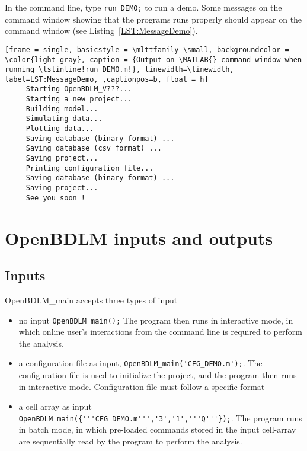 \documentclass{article}
\begin{document}
In the \MATLAB{} command line, type  
\colorbox{light-gray}{\lstinline[basicstyle = \mlttfamily \small, backgroundcolor = \color{light-gray}]!run_DEMO;! }
 to run a demo. 
Some messages on the \MATLAB{} command window showing that the programs runs properly  should appear on the \MATLAB{} command window (see Listing~\ref{LST:MessageDemo}).

\begin{lstlisting}[frame = single, basicstyle = \mlttfamily \small, backgroundcolor = \color{light-gray}, caption = {Output on \MATLAB{} command window when running \lstinline!run_DEMO.m!}, linewidth=\linewidth, label=LST:MessageDemo, ,captionpos=b, float = h] 
     Starting OpenBDLM_V???...
     Starting a new project...
     Building model...
     Simulating data...
     Plotting data...
     Saving database (binary format) ...
     Saving database (csv format) ...
     Saving project...
     Printing configuration file...
     Saving database (binary format) ...
     Saving project...
     See you soon !
\end{lstlisting}

\section{OpenBDLM inputs and outputs}

\subsection{Inputs}

OpenBDLM\_main accepts three types of input
\begin{itemize}
  \item no input \lstinline[basicstyle = \mlttfamily \small]!OpenBDLM_main();! The program then runs in interactive mode, in which online user's interactions from the command line is required to perform the analysis.
    \item  a configuration file as input, \lstinline[basicstyle = \mlttfamily \small]!OpenBDLM_main('CFG_DEMO.m');!. The configuration file is used to initialize the project, and the program then runs in interactive mode. Configuration file must follow a specific format 
   \item a cell array as input \lstinline[basicstyle = \mlttfamily \small]!OpenBDLM_main({'''CFG_DEMO.m''','3','1','''Q'''});!. The program runs in batch mode, in which pre-loaded commands stored in the input cell-array are sequentially read by the program to perform the analysis.
\end{itemize}
\end{document}
